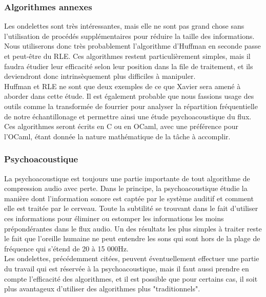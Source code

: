 \documentclass[a4paper,12pt]{article}
\begin{document}
		\subsubsection{Algorithmes annexes}
Les ondelettes  sont très  intéressantes,  mais elle  ne sont  pas grand
chose  sans l'utilisation  de procédés  supplémentaires pour  réduire la
taille  des  informations.   Nous  utiliserons  donc  très  probablement
l'algorithme  d'Huffman  en  seconde  passe  et  peut-être  du RLE.  Ces
algorithmes  restent particulièrement  simples,  mais il  faudra étudier
leur efficacité selon leur position  dans la file de traitement,  et ils
deviendront donc intrinsèquement plus difficiles à manipuler.\\
Huffman et RLE ne  sont que deux exemples de ce que  Xavier sera amené à
aborder dans cette  étude.  Il est également probable  que nous fassions
usage des outils  comme  la  transformée  de  fourrier  pour analyser la
répartition fréquentielle de notre échantillonage et permettre ainsi une
étude psychoacoustique du flux.\\
Ces algorithmes seront écrits en C ou en OCaml, avec une préférence pour
l'OCaml, étant donnée la nature mathématique de la tâche à accomplir.

		\subsubsection{Psychoacoustique}
La  psychoacoustique   est  toujours  une  partie   importante  de  tout
algorithme  de  compression  audio  avec  perte.  Dans  le principe,  la
psychoacoustique étudie la manière  dont l'information sonore est captée
par le système  auditif  et  comment  elle  est  traitée par le cerveau.
Toute la subtilité se trouvant  dans le fait d'utiliser ces informations
pour éliminer ou estomper les informations les moins prépondérantes dans
le flux  audio.  Un des résultats les  plus simples  à traiter  reste le
fait que l'oreille humaine ne peut entendre les sons qui sont hors de la
plage de fréquence qui s'étend de 20 à 15 000Hz.\\
Les ondelettes,  précédemment  citées,  peuvent éventuellement effectuer
une partie du  travail qui est réservée à  la psychoacoustique,  mais il
faut aussi  prendre en compte  l'efficacité des algorithmes,  et  il est
possible que pour certains cas,  il  soit plus avantageux d'utiliser des
algorithmes plus "traditionnels".
\end{document}
